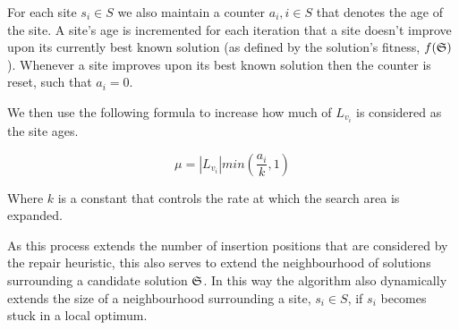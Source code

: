 For each site $s_i \in S$ we also maintain a counter $a_i, i \in S$ that denotes the age of the site. A site's age is incremented for each iteration that a site doesn't improve upon its currently best known solution (as defined by the solution's fitness, $f(\mathfrak{S})$). Whenever a site improves upon its best known solution then the counter is reset, such that $a_i = 0$.


We then use the following formula to increase how much of $L_{v_i}$ is considered as the site ages.

\[
   \mu = \left|L_{v_i}\right| min\left(\frac{a_i}{k}, 1\right)
\]

Where $k$ is a constant that controls the rate at which the search area is expanded. 

As this process extends the number of insertion positions that are considered by the repair heuristic, this also serves to extend the neighbourhood of solutions surrounding a candidate solution $\mathfrak{S}$. In this way the algorithm also dynamically extends the size of a neighbourhood surrounding a site, $s_i \in S$, if $s_i$ becomes stuck in a local optimum.


